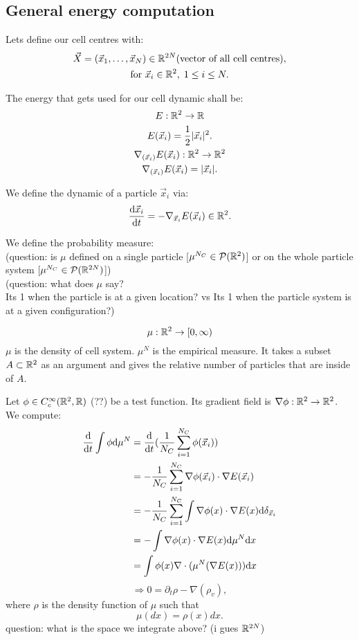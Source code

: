 \subsection{General energy computation}

Lets define our cell centres with:
\begin{gather*}
    \vec{X} = (\vec{x}_1, \ldots, \vec{x}_N) \in \mathbb{R}^{2N} \text{(vector of all cell centres)}, \\
    \text{for } \vec{x}_i \in \mathbb{R}^2, \; 1 \leq i \leq N. \\
\end{gather*}

The energy that gets used for our cell dynamic shall be: 
\begin{gather*}
    E: \mathbb{R}^2 \rightarrow \mathbb{R} \\ 
    E(\vec{x}_i) = \frac{1}{2} |\vec{x}_i|^2. \\
    \nabla_{(\vec{x}_i)} E(\vec{x}_i): \mathbb{R}^2 \rightarrow \mathbb{R}^2 \\
    \nabla_{(\vec{x}_i)} E(\vec{x}_i) = |\vec{x}_i| . \\
\end{gather*}

We define the dynamic of a particle $\vec{x}_i$ via: \\
\[ \dfrac{\mathrm{d} \vec{x}_i}{\mathrm{d} t} = - \nabla_{\vec{x}_i} E(\vec{x}_i) \in \mathbb{R}^{2}. \]

We define the probability measure:\\
(question: is $\mu$ defined on a single particle [$\mu^{N_C} \in \mathcal{P}(\mathbb{R}^2)$] or on the whole particle system [$\mu^{N_C} \in \mathcal{P}(\mathbb{R}^{2N})$]) \\
(question: what does $\mu$ say? \\
Its 1 when the particle is at a given location? vs Its 1 when the particle system is at a given configuration?)


\[ \mu: \mathbb{R}^2 \rightarrow [0,\infty)  \]
$\mu$ is the density of cell system.
$\mu^N$ is the empirical measure. 
It takes a subset $A \subset \mathbb{R}^2$ as an argument and gives the relative number of particles that are inside of $A$. 

Let $\phi \in C_c^{\infty}(\mathbb{R}^{2}, \mathbb{R})$ (??) be a test function. 
Its gradient field is $ \nabla \phi : \mathbb{R}^2 \rightarrow \mathbb{R}^2$. 
We compute: 
\begin{align*}
    \frac{\mathrm{d}}{\mathrm{d} t} \int \phi \mathrm{d} \mu^N 
    &= \frac{\mathrm{d}}{\mathrm{d} t} (\frac{1}{N_C} \sum\limits_{i=1}^{N_C} \phi(\vec{x}_i)) \\
    &= - \frac{1}{N_C} \sum\limits_{i=1}^{N_C} \nabla \phi(\vec{x}_i) \cdot \nabla E(\vec{x}_i) \\
    &= - \frac{1}{N_C} \sum\limits_{i=1}^{N_C} \int \nabla \phi(x) \cdot \nabla E(x) \mathrm{d} \delta_{\vec{x}_i} \\
    &= - \int \nabla \phi(x) \cdot \nabla E(x) \mathrm{d} \mu^N \mathrm{d} x \\
    &= \int \phi(x)  \nabla \cdot ( \mu^N(\nabla E(x))) \mathrm{d} x \\
\end{align*}
\[ \Rightarrow  0 = \partial_t \rho - \nabla(\rho_v),\]
where $\rho$ is the density function of $\mu$ such that \[ \mu(dx) = \rho(x) dx. \]
question: what is the space we integrate above? (i gues $\mathbb{R}^{2N}$)